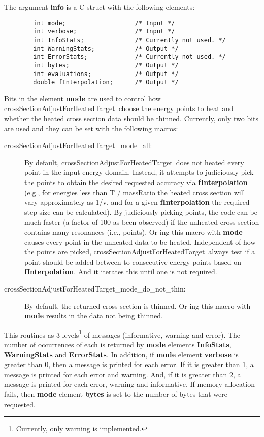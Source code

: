 \documentclass[11pt,twoside]{article}
\def\CRoutine{crossSectionAdjustForHeatedTarget}
\def\CRoutineS{\CRoutine \ }
\begin{document}
The argument {\bf info} is a C struct with the following elements:
\begin{verbatim}
        int mode;                   /* Input */
        int verbose;                /* Input */
        int InfoStats;              /* Currently not used. */
        int WarningStats;           /* Output */
        int ErrorStats;             /* Currently not used. */
        int bytes;                  /* Output */
        int evaluations;            /* Output */
        double fInterpolation;      /* Output */
\end{verbatim}
Bits in the element {\bf mode} are used to control how \CRoutineS choose the energy points to heat and whether the
heated cross section data should be thinned. Currently, only two bits are used and they can be set with the following
macros:
\begin{description}
\item[ crossSectionAdjustForHeatedTarget\_mode\_all:] By default, \CRoutineS does not heated every point in the input energy domain.
    Instead, it attempts to judiciously pick the points to obtain the desired requested accuracy via {\bf fInterpolation} (e.g., for energies
    less than T / massRatio the heated cross section will vary approximately as 1/v, and for a given {\bf fInterpolation} the required step size
    can be calculated). By judiciously picking points, the code can be much faster (a-factor-of 100 as been observed) if the unheated cross section
    contains many resonances (i.e., points). Or-ing this macro with {\bf mode} causes every point in the unheated data to be heated.
    Independent of how the points are picked, \CRoutineS always test if a point should be added between to consecutive energy points
    based on {\bf fInterpolation}. And it iterates this until one is not required.

\item[crossSectionAdjustForHeatedTarget\_mode\_do\_not\_thin:] By default, the returned cross section is thinned. Or-ing this macro 
    with {\bf mode} results in the data not being thinned.
\end{description}

This routines as 3-levels\footnote{Currently, only warning is implemented.} of messages (informative, warning and error). The number of occurrences
of each is returned by {\bf mode} elements {\bf InfoStats}, {\bf WarningStats} and {\bf ErrorStats}. In addition, if {\bf mode} element {\bf verbose}
is greater than 0, then a message is printed for each error. If it is greater than 1, a message is printed for each error and warning. And, if
it is greater than 2, a message is printed for each error, warning and informative. If memory allocation fails, then {\bf mode} element {\bf bytes}
is set to the number of bytes that were requested.
\end{document}
